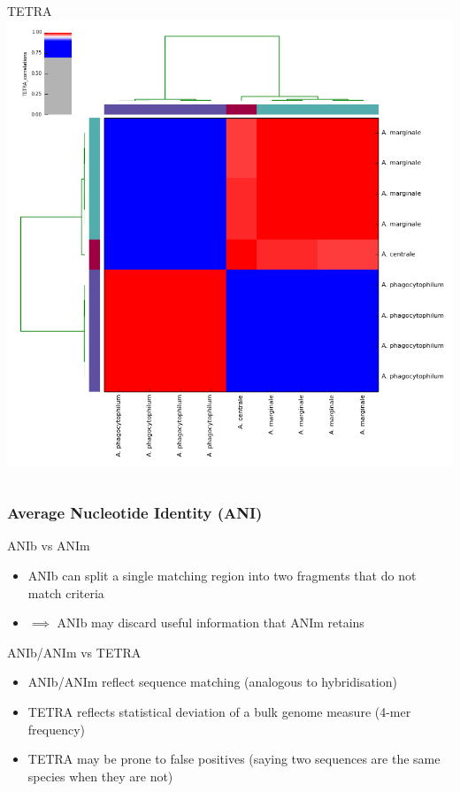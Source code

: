 \begin{frame}
\begin{columns}
      TETRA \\
      \includegraphics[width=\textwidth]{images/TETRA_correlations}    
  \end{columns} 
\end{frame}


%
\begin{frame}
  \frametitle{Average Nucleotide Identity (ANI)}
  \textcolor{hutton_green}{ANIb vs ANIm}
  \begin{itemize}
    \item ANIb can split a single matching region into two fragments that do not match criteria
    \item $\implies$ ANIb may discard useful information that ANIm retains
  \end{itemize}
  \textcolor{hutton_blue}{ANIb/ANIm vs TETRA}
  \begin{itemize}
    \item ANIb/ANIm reflect sequence matching (analogous to hybridisation)
    \item TETRA reflects statistical deviation of a bulk genome measure (4-mer frequency)
    \item TETRA may be prone to false positives (saying two sequences are the same species when they are not)
  \end{itemize}  
\end{frame}
